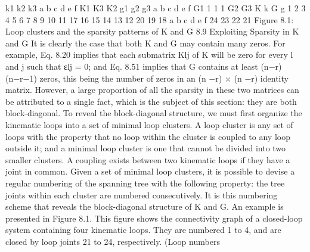 k1 k2 k3 a b c d e f K1 K3 K2 g1 g2 g3 a b c d e f G1 1 1 1 G2 G3 K k G g 1 2 3 4 5 6 7 8 9 10 11 17 16 15 14 13 12 20 19 18 a b c d e f 24 23 22 21 Figure 8.1: Loop clusters and the sparsity patterns of K and G 8.9 Exploiting Sparsity in K and G It is clearly the case that both K and G may contain many zeros. For example, Eq. 8.20 implies that each submatrix Klj of K will be zero for every l and j such that εlj = 0; and Eq. 8.51 implies that G contains at least (n−r)(n−r−1) zeros, this being the number of zeros in an (n −r) × (n −r) identity matrix. However, a large proportion of all the sparsity in these two matrices can be attributed to a single fact, which is the subject of this section: they are both block-diagonal. To reveal the block-diagonal structure, we must first organize the kinematic loops into a set of minimal loop clusters. A loop cluster is any set of loops with the property that no loop within the cluster is coupled to any loop outside it; and a minimal loop cluster is one that cannot be divided into two smaller clusters. A coupling exists between two kinematic loops if they have a joint in common. Given a set of minimal loop clusters, it is possible to devise a regular numbering of the spanning tree with the following property: the tree joints within each cluster are numbered consecutively. It is this numbering scheme that reveals the block-diagonal structure of K and G. An example is presented in Figure 8.1. This figure shows the connectivity graph of a closed-loop system containing four kinematic loops. They are numbered 1 to 4, and are closed by loop joints 21 to 24, respectively. (Loop numbers

